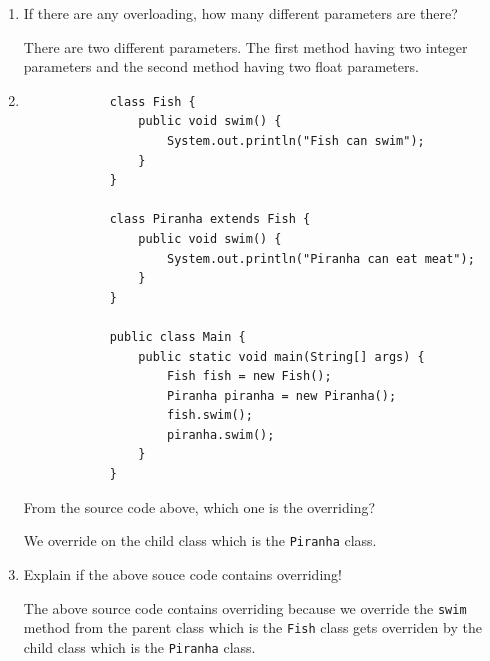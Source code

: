 \documentclass[12pt,titlepage]{article}
\begin{document}
\begin{enumerate}
{        The overloading can be seen at the second method where we declare a method with the same name but with different data type of parameters.
    }
    \item {
        If there are any overloading, how many different parameters are there?

        There are two different parameters. The first method having two integer parameters and the second method having two float parameters.
    }
    \item {
        \begin{verbatim}
            class Fish {
                public void swim() {
                    System.out.println("Fish can swim");
                }
            }

            class Piranha extends Fish {
                public void swim() {
                    System.out.println("Piranha can eat meat");
                }
            }

            public class Main {
                public static void main(String[] args) {
                    Fish fish = new Fish();
                    Piranha piranha = new Piranha();
                    fish.swim();
                    piranha.swim();
                }
            }
        \end{verbatim}

        From the source code above, which one is the overriding?

        We override on the child class which is the \texttt{Piranha} class.
    }
    \item {
        Explain if the above souce code contains overriding!

        The above source code contains overriding because we override the \texttt{swim} method from the parent class which is the \texttt{Fish} class
        gets overriden by the child class which is the \texttt{Piranha} class.
    }
\end{enumerate}

\pagebreak
\end{document}
